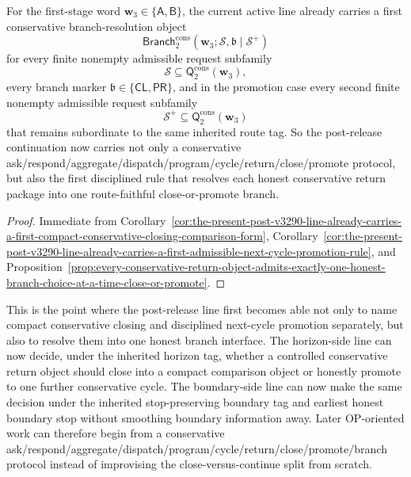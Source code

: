\begin{corollary}
\label{cor:the-present-post-v3290-line-already-carries-a-first-conservative-branch-resolution-rule}
For the first-stage word \(\mathbf w_3\in\{\mathsf A,\mathsf B\}\), the current active line already carries a first conservative branch-resolution object
\[
 \mathsf{Branch}^{\mathrm{cons}}_{2}(\mathbf w_3;\mathcal S,\mathfrak b\mid\mathcal S^{+})
\]
for every finite nonempty admissible request subfamily
\[
 \mathcal S\subseteq \mathsf{Q}^{\mathrm{cons}}_{2}(\mathbf w_3),
\]
every branch marker \(\mathfrak b\in\{\mathsf{CL},\mathsf{PR}\}\), and in the promotion case every second finite nonempty admissible request subfamily
\[
 \mathcal S^{+}\subseteq \mathsf{Q}^{\mathrm{cons}}_{2}(\mathbf w_3)
\]
that remains subordinate to the same inherited route tag. So the post-release continuation now carries not only a conservative ask/respond/aggregate/dispatch/program/cycle/return/close/promote protocol, but also the first disciplined rule that resolves each honest conservative return package into one route-faithful close-or-promote branch.
\end{corollary}

\begin{proof}
Immediate from Corollary~\ref{cor:the-present-post-v3290-line-already-carries-a-first-compact-conservative-closing-comparison-form}, Corollary~\ref{cor:the-present-post-v3290-line-already-carries-a-first-admissible-next-cycle-promotion-rule}, and Proposition~\ref{prop:every-conservative-return-object-admits-exactly-one-honest-branch-choice-at-a-time-close-or-promote}.
\end{proof}

\begin{remark}
\label{rem:what-the-first-conservative-branch-resolution-rule-now-buys}
This is the point where the post-release line first becomes able not only to name compact conservative closing and disciplined next-cycle promotion separately, but also to resolve them into one honest branch interface. The horizon-side line can now decide, under the inherited horizon tag, whether a controlled conservative return object should close into a compact comparison object or honestly promote to one further conservative cycle. The boundary-side line can now make the same decision under the inherited stop-preserving boundary tag and earliest honest boundary stop without smoothing boundary information away. Later OP-oriented work can therefore begin from a conservative ask/respond/aggregate/dispatch/program/cycle/return/close/promote/branch protocol instead of improvising the close-versus-continue split from scratch.
\end{remark}



